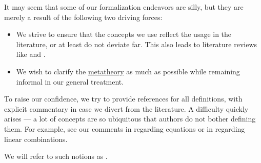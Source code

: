 \begin{concept}\label{con:assumed_knowledge}
  It may seem that some of our formalization endeavors are silly, but they are merely a result of the following two driving forces:
  \begin{itemize}
    \item We strive to ensure that the concepts we use reflect the usage in the literature, or at least do not deviate far. This also leads to literature reviews like  and .

    \item We wish to clarify the \hyperref[con:metalogic]{metatheory} as much as possible while remaining informal in our general treatment.
  \end{itemize}

  To raise our confidence, we try to provide references for all definitions, with explicit commentary in case we divert from the literature. A difficulty quickly arises --- a lot of concepts are so ubiquitous that authors do not bother defining them. For example, see our comments in  regarding equations or in  regarding linear combinations.

  We will refer to such notions as .
\end{concept}
